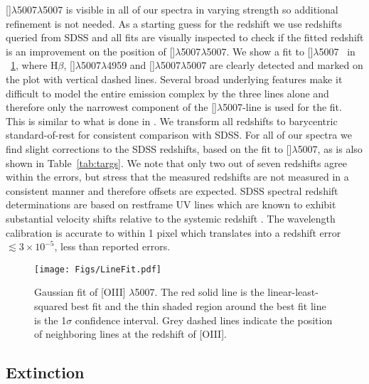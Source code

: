 \documentclass{aa}    %
\newcommand{\figref}[1]{\ref{fig:#1}}
\newcommand{\Fig}[1]{\figurename~\figref{#1}}
\newcommand{\figlabel}[1]{\label{fig:#1}}
\newcommand{\Tab}[1]{Table~\ref{tab:#1}}
\newcommand{\tab}[1]{\Tab{#1}}
\newcommand{\sectlabel}[1]{\label{sect:#1}}
\newcommand{\hb}{H$\beta$}
\newcommand{\oiii}{[\ion{O}{iii}]$\lambda$5007}
\begin{document}
\oiii$\lambda$5007 is visible in all of our spectra in varying strength so additional refinement is not needed. As a starting guess for the redshift we use redshifts queried from SDSS and all fits are visually inspected to check if the fitted redshift is an improvement on the position of \oiii$\lambda$5007. We show a fit to \oiii~ in \Fig{linefit}, where \hb, \oiii$\lambda$4959 and \oiii$\lambda$5007 are clearly detected and marked on the plot with vertical dashed lines. Several broad underlying features make it difficult to model the entire emission complex by the three lines alone and therefore only the narrowest component of the \oiii-line is used for the fit. This is similar to what is done in \citet{VandenBerk2001}. We transform all redshifts to barycentric standard-of-rest for consistent comparison with SDSS. For all of our spectra we find slight corrections to the SDSS redshifts, based on the fit to \oiii, as is also shown in \tab{targs}. We note that only two out of seven redshifts agree within the errors, but stress that the measured redshifts are not measured in a consistent manner and therefore offsets are expected. SDSS spectral redshift determinations are based on restframe UV lines which are known to exhibit substantial velocity shifts relative to the systemic redshift \citep{Tytler1992, Hewett2010}. The wavelength calibration is accurate to within 1 pixel \citep{Kruhler2015} which translates into a redshift error $\lesssim 3\times 10^{-5}$, less than reported errors.

\begin{figure}[t!]
  \centering
  \texttt{[image: Figs/LineFit.pdf]}
  \caption[]{Gaussian fit of [OIII] $\lambda$5007. The red solid line is the linear-least-squared best fit and the thin shaded region around the best fit line is the 1$\sigma$ confidence interval. Grey dashed lines indicate the position of neighboring lines at the redshift of [OIII].}
  \figlabel{linefit}
\end{figure}




\subsection{Extinction} \sectlabel{extinct}
\end{document}
